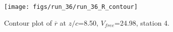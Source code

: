 \begin{figure}[H]
\centering
\texttt{[image: figs/run\_36/run\_36\_R\_contour]}
\caption{Contour plot of $\overline{r}$ at $z/c$=8.50, $V_{free}$=24.98, station 4.}
\label{fig:run_36_R_contour}
\end{figure}



